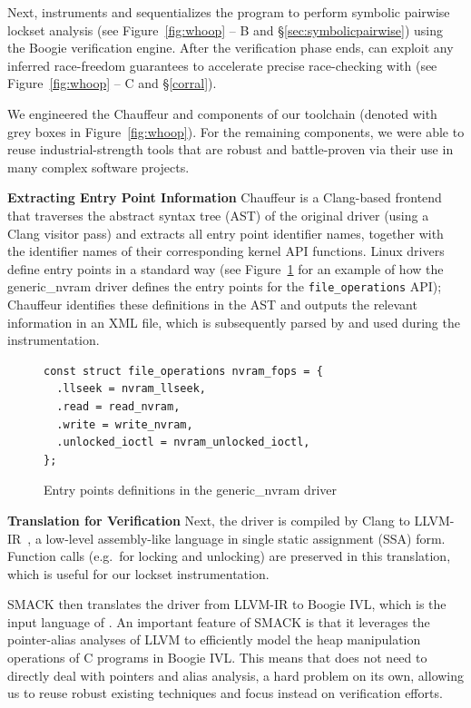 Next, \whoop instruments and sequentializes the program to perform symbolic pairwise lockset analysis (see Figure~\ref{fig:whoop} -- B and \S\ref{sec:symbolicpairwise}) using the Boogie verification engine. After the verification phase ends, \whoop can exploit any inferred race-freedom guarantees to accelerate precise race-checking with \corral (see Figure~\ref{fig:whoop} -- C and \S\ref{corral}).

We engineered the Chauffeur and \whoop components of our toolchain (denoted with grey boxes in Figure~\ref{fig:whoop}).  For the remaining components, we were able to reuse industrial-strength tools that are robust and battle-proven via their use in many complex software projects.

\noindent\textbf{Extracting Entry Point Information }
%
Chauffeur is a Clang-based frontend that traverses the abstract syntax tree (AST) of the original driver (using a Clang visitor pass) and extracts all entry point identifier names, together with the identifier names of their corresponding kernel API functions. Linux drivers define entry points in a standard way (see Figure~\ref{fig:entrypoints} for an example of how the generic\_nvram driver defines the entry points for the \texttt{file\_operations} API); Chauffeur identifies these definitions in the AST and outputs the relevant information in an XML file, which is subsequently parsed by \whoop and used during the instrumentation.

\begin{figure}[t]
\begin{lstlisting}
const struct file_operations nvram_fops = {
  .llseek = nvram_llseek,
  .read = read_nvram,
  .write = write_nvram,
  .unlocked_ioctl = nvram_unlocked_ioctl,
};
\end{lstlisting}
\caption{Entry points definitions in the generic\_nvram driver}
\label{fig:entrypoints}
\end{figure}

\noindent\textbf{Translation for Verification }
%
Next, the driver is compiled by Clang to LLVM-IR~\cite{lattner2004llvm}, a low-level assembly-like language in single static assignment (SSA) form. Function calls (e.g.\ for locking and unlocking) are preserved in this translation, which is useful for our lockset instrumentation.

SMACK then translates the driver from LLVM-IR to Boogie IVL, which is the input language of \whoop. An important feature of SMACK is that it leverages the pointer-alias analyses of LLVM to efficiently model the heap manipulation operations of C programs in Boogie IVL. This means that \whoop does not need to directly deal with pointers and alias analysis, a hard problem on its own, allowing us to reuse robust existing techniques and focus instead on verification efforts.


